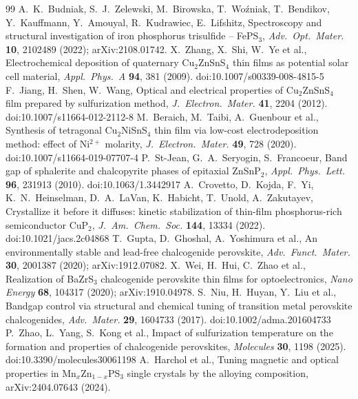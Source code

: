 \documentclass[11pt,a4paper]{article}
\begin{document}
\begin{thebibliography}{99}
 A.~K.~Budniak, S.~J.~Zelewski, M.~Birowska, T.~Wo\'zniak, T.~Bendikov, Y.~Kauffmann, Y.~Amouyal, R.~Kudrawiec, E.~Lifshitz, Spectroscopy and structural investigation of iron phosphorus trisulfide -- FePS$_3$, \emph{Adv.\ Opt.\ Mater.} \textbf{10}, 2102489 (2022); arXiv:2108.01742.
 X.~Zhang, X.~Shi, W.~Ye et al., Electrochemical deposition of quaternary Cu$_2$ZnSnS$_4$ thin films as potential solar cell material, \emph{Appl.\ Phys.\ A} \textbf{94}, 381 (2009). doi:10.1007/s00339-008-4815-5
 F.~Jiang, H.~Shen, W.~Wang,  Optical and electrical properties of Cu$_2$ZnSnS$_4$ film prepared by sulfurization method, \emph{J.\ Electron.\ Mater.} \textbf{41}, 2204 (2012). doi:10.1007/s11664-012-2112-8
 M.~Beraich, M.~Taibi, A.~Guenbour et al., Synthesis of tetragonal Cu$_2$NiSnS$_4$ thin film via low-cost electrodeposition method: effect of Ni$^{2+}$ molarity, \emph{J.\ Electron.\ Mater.} \textbf{49}, 728 (2020). doi:10.1007/s11664-019-07707-4
 P.~St-Jean, G.~A.~Seryogin, S.~Francoeur, Band gap of sphalerite and chalcopyrite phases of epitaxial ZnSnP$_2$, \emph{Appl.\ Phys.\ Lett.} \textbf{96}, 231913 (2010). doi:10.1063/1.3442917
 A.~Crovetto, D.~Kojda, F.~Yi, K.~N.~Heinselman, D.~A.~LaVan, K.~Habicht, T.~Unold, A.~Zakutayev, Crystallize it before it diffuses: kinetic stabilization of thin-film phosphorus-rich semiconductor CuP$_2$, \emph{J.\ Am.\ Chem.\ Soc.} \textbf{144}, 13334 (2022). doi:10.1021/jacs.2c04868
 T.~Gupta, D.~Ghoshal, A.~Yoshimura et al., An environmentally stable and lead-free chalcogenide perovskite, \emph{Adv.\ Funct.\ Mater.} \textbf{30}, 2001387 (2020); arXiv:1912.07082.
 X.~Wei, H.~Hui, C.~Zhao et al., Realization of BaZrS$_3$ chalcogenide perovskite thin films for optoelectronics, \emph{Nano Energy} \textbf{68}, 104317 (2020); arXiv:1910.04978.
 S.~Niu, H.~Huyan, Y.~Liu et al., Bandgap control via structural and chemical tuning of transition metal perovskite chalcogenides, \emph{Adv.\ Mater.} \textbf{29}, 1604733 (2017). doi:10.1002/adma.201604733
 P.~Zhao, L.~Yang, S.~Kong et al., Impact of sulfurization temperature on the formation and properties of chalcogenide perovskites, \emph{Molecules} \textbf{30}, 1198 (2025). doi:10.3390/molecules30061198
 A.~Harchol et al., Tuning magnetic and optical properties in Mn$_x$Zn$_{1-x}$PS$_3$ single crystals by the alloying composition, arXiv:2404.07643 (2024).
\end{thebibliography}
\end{document}
